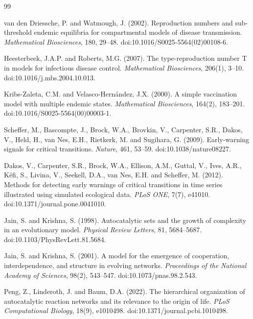 \documentclass[11pt]{article}
\begin{document}
\begin{thebibliography}{99}

van den Driessche, P. and Watmough, J. (2002).
Reproduction numbers and sub-threshold endemic equilibria for compartmental models of disease transmission.
\emph{Mathematical Biosciences}, 180, 29--48. doi:10.1016/S0025-5564(02)00108-6.

Heesterbeek, J.A.P. and Roberts, M.G. (2007).
The type-reproduction number T in models for infectious disease control.
\emph{Mathematical Biosciences}, 206(1), 3--10. doi:10.1016/j.mbs.2004.10.013.

Kribs-Zaleta, C.M. and Velasco-Hern\'andez, J.X. (2000).
A simple vaccination model with multiple endemic states.
\emph{Mathematical Biosciences}, 164(2), 183--201. doi:10.1016/S0025-5564(00)00003-1.

Scheffer, M., Bascompte, J., Brock, W.A., Brovkin, V., Carpenter, S.R., Dakos, V., Held, H., van Nes, E.H., Rietkerk, M. and Sugihara, G. (2009).
Early-warning signals for critical transitions.
\emph{Nature}, 461, 53--59. doi:10.1038/nature08227.

Dakos, V., Carpenter, S.R., Brock, W.A., Ellison, A.M., Guttal, V., Ives, A.R., K\'efi, S., Livina, V., Seekell, D.A., van Nes, E.H. and Scheffer, M. (2012).
Methods for detecting early warnings of critical transitions in time series illustrated using simulated ecological data.
\emph{PLoS ONE}, 7(7), e41010. doi:10.1371/journal.pone.0041010.

Jain, S. and Krishna, S. (1998).
Autocatalytic sets and the growth of complexity in an evolutionary model.
\emph{Physical Review Letters}, 81, 5684--5687. doi:10.1103/PhysRevLett.81.5684.

Jain, S. and Krishna, S. (2001).
A model for the emergence of cooperation, interdependence, and structure in evolving networks.
\emph{Proceedings of the National Academy of Sciences}, 98(2), 543--547. doi:10.1073/pnas.98.2.543.

Peng, Z., Linderoth, J. and Baum, D.A. (2022).
The hierarchical organization of autocatalytic reaction networks and its relevance to the origin of life.
\emph{PLoS Computational Biology}, 18(9), e1010498. doi:10.1371/journal.pcbi.1010498.


\end{thebibliography}
\end{document}
